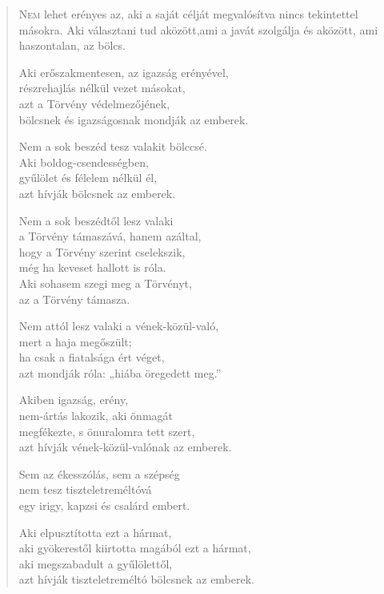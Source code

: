 
\begin{verse}

{\par%
\lettrine{N}{em} {\LettrineTextFont lehet erényes az, aki a saját célját}\newline
megvalósítva nincs tekintettel másokra.\newline
Aki választani tud aközött,\verselinebreak ami a javát szolgálja\verselinebreak
és aközött, ami haszontalan, az bölcs.
\par}

 Aki erőszakmentesen, az igazság erényével,\\
részrehajlás nélkül vezet másokat,\\
azt a Törvény védelmezőjének,\\
bölcsnek és igazságosnak mondják az emberek.

 Nem a sok beszéd tesz valakit bölccsé.\\
Aki boldog-csendességben,\\
gyűlölet és félelem nélkül él,\\
azt hívják bölcsnek az emberek.

 Nem a sok beszédtől lesz valaki\\
a Törvény támaszává, hanem azáltal,\\
hogy a Törvény szerint cselekszik,\\
még ha keveset hallott is róla.\\
Aki sohasem szegi meg a Törvényt,\\
az a Törvény támasza.

 Nem attól lesz valaki a vének-közül-való,\\
mert a haja megőszült;\\
ha csak a fiatalsága ért véget,\\
azt mondják róla: „hiába öregedett meg.”

 Akiben igazság, erény,\\
nem-ártás lakozik, aki önmagát\\
megfékezte, s önuralomra tett szert,\\
azt hívják vének-közül-valónak az emberek.

 Sem az ékesszólás, sem a szépség\\
nem tesz tiszteletreméltóvá\\
egy irigy, kapzsi és csalárd embert.

 Aki elpusztította ezt a hármat,\\
aki gyökerestől kiirtotta magából ezt a hármat,\\
aki megszabadult a gyűlölettől,\\
azt hívják tiszteletreméltó bölcsnek az emberek.


\end{verse}
